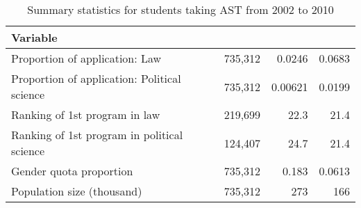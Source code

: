 \begin{table}[]

    \caption{Summary statistics for students taking AST from 2002 to 2010}
    \label{tab:summstat-univ-preference}

    \begin{tabular}{lc *{2}{d{3.4}}}
        \toprule
        Variable                                     &  &  &  \\ \midrule
        Proportion of application: Law               & 735,312   & 0.0246    & 0.0683         \\
        Proportion of application: Political science & 735,312   & 0.00621   & 0.0199         \\
        Ranking of 1st program in law                & 219,699   & 22.3      & 21.4           \\
        Ranking of 1st program in political science  & 124,407   & 24.7      & 21.4           \\
        Gender quota proportion                      & 735,312   & 0.183     & 0.0613         \\
        Population size (thousand)                   & 735,312   & 273       & 166            \\ \bottomrule
    \end{tabular}
\end{table}